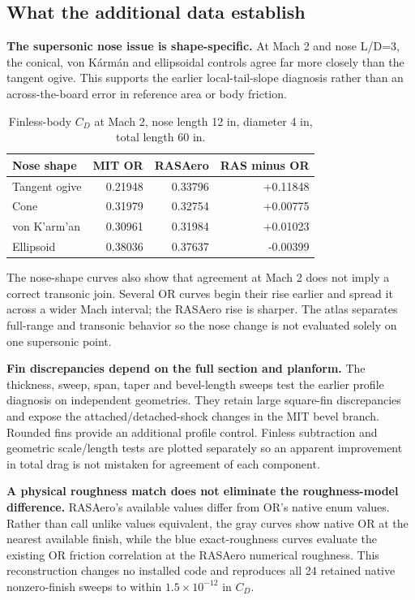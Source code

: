 \documentclass[oneside,openany]{amsdtx}
\begin{document}
\clearpage\subsection{What the additional data establish}
\textbf{The supersonic nose issue is shape-specific.} At Mach 2 and nose L/D=3, the conical, von K\'arm\'an and ellipsoidal controls agree far more closely than the tangent ogive. This supports the earlier local-tail-slope diagnosis rather than an across-the-board error in reference area or body friction.
\begin{table}[H]\centering\small
\caption{Finless-body $C_D$ at Mach 2, nose length 12 in, diameter 4 in, total length 60 in.}
\begin{tabular}{@{}lrrr@{}}\toprule
Nose shape & MIT OR & RASAero & RAS minus OR\\\midrule


Tangent ogive & 0.21948 & 0.33796 & +0.11848\\

Cone & 0.31979 & 0.32754 & +0.00775\\

von K'arm'an & 0.30961 & 0.31984 & +0.01023\\

Ellipsoid & 0.38036 & 0.37637 & -0.00399\\


\bottomrule\end{tabular}\end{table}
The nose-shape curves also show that agreement at Mach 2 does not imply a correct transonic join. Several OR curves begin their rise earlier and spread it across a wider Mach interval; the RASAero rise is sharper. The atlas separates full-range and transonic behavior so the nose change is not evaluated solely on one supersonic point.

\textbf{Fin discrepancies depend on the full section and planform.} The thickness, sweep, span, taper and bevel-length sweeps test the earlier profile diagnosis on independent geometries. They retain large square-fin discrepancies and expose the attached/detached-shock changes in the MIT bevel branch. Rounded fins provide an additional profile control. Finless subtraction and geometric scale/length tests are plotted separately so an apparent improvement in total drag is not mistaken for agreement of each component.

\textbf{A physical roughness match does not eliminate the roughness-model difference.} RASAero's available values differ from OR's native enum values. Rather than call unlike values equivalent, the gray curves show native OR at the nearest available finish, while the blue exact-roughness curves evaluate the existing OR friction correlation at the RASAero numerical roughness. This reconstruction changes no installed code and reproduces all 24 retained native nonzero-finish sweeps to within $1.5\times10^{-12}$ in $C_D$.
\end{document}
